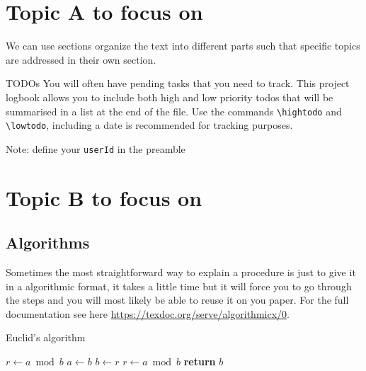 \documentclass{project-logbook}
\begin{document}
\section{Topic A to focus on} \label{sec:topic_A}
	We can use sections organize the text into different parts  such that specific topics are addressed in their own section.

		\begin{HighlightedNote}{TODOs}
			You will often have pending tasks that you need to track. This project logbook allows you to include both high and low priority todos that will be summarised in a list at the end of the file. Use the commands \texttt{\textbackslash hightodo} and \texttt{\textbackslash lowtodo}, including a date is recommended for tracking purposes.

			Note: define your \texttt{userId} in the preamble
		\end{HighlightedNote}





\section{Topic B to focus on} \label{sec:topic_B}

	\subsection{Algorithms} \label{sub:algorithms}

		\begin{HighlightedNote}{}
			Sometimes the most straightforward way to explain a procedure is just to give it in a algorithmic format, it takes a little time but it will force you to go through the steps and you will most likely be able to reuse it on you paper. For the full documentation see here \url{https://texdoc.org/serve/algorithmicx/0}.
		\end{HighlightedNote}

		\begin{algorithm}
			\caption{Euclid’s algorithm}\label{alg:euclid}
			\begin{algorithmic}[1]
					\State $r\gets a\bmod b$
						\State $a\gets b$
						\State $b\gets r$
						\State $r\gets a\bmod b$
					\EndWhile\label{euclidendwhile}
					\State \textbf{return} $b$
				\EndProcedure
			\end{algorithmic}
		\end{algorithm}
\end{document}
